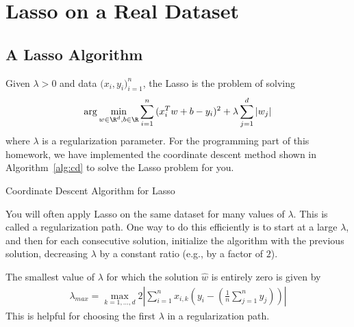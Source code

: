 \documentclass{article}
\begin{document}
\section*{Lasso on a Real Dataset}

\subsection*{A Lasso Algorithm}
Given $\lambda >0$ and data $\Big (x_i,y_i \Big)_{i=1}^n$, the Lasso is the problem of solving
\begin{equation*}\label{eq:lasso}
  \arg\min_{{w}\in \R^d, b \in \R} \sum_{i=1}^n { (x_i^T {w} + b - {y}_i)^2 }
    + \lambda \sum_{j=1}^d |{w}_j| 
\end{equation*}
where $\lambda$ is a regularization parameter.
For the programming part of this homework, we have implemented the coordinate descent method shown in Algorithm~\ref{alg:cd} to solve the Lasso problem for you.

\begin{algorithm}[h]
    \caption{Coordinate Descent Algorithm for Lasso}\label{alg:cd}
\end{algorithm}

    You will often apply Lasso on the same dataset for many values of $\lambda$.  This
    is called a regularization path.  One way to do this efficiently is to start at a large $\lambda$, and then for each consecutive solution, initialize the algorithm with the previous solution, decreasing $\lambda$ by a constant ratio (e.g., by a factor of $2$).
  
  The smallest value of $\lambda$ for which the solution $\widehat{w}$ is entirely zero is given by
       \begin{align}
           \lambda_{max} = \max_{k=1,\dots,d} 2 \left|\sum_{i=1}^n {x}_{i,k} \left({y}_i - \left(\frac{1}{n} \sum_{j=1}^n y_j \right)\right)\right|\label{eqn:lasso-lambdamax}
       \end{align}
      This is helpful for choosing the first $\lambda$ in a regularization path. 
\end{document}
